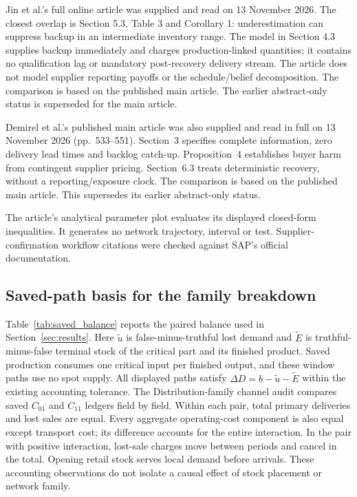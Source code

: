 \documentclass[preprint,11pt,authoryear]{elsarticle}
\begin{document}
Jin et al.'s full online article was supplied and read on 13 November 2026. The closest overlap is Section 5.3, Table 3 and Corollary 1: underestimation can suppress backup in an intermediate inventory range. The model in Section 4.3 supplies backup immediately and charges production-linked quantities; it contains no qualification lag or mandatory post-recovery delivery stream. The article does not model supplier reporting payoffs or the schedule/belief decomposition. The comparison is based on the published main article. The earlier abstract-only status is superseded for the main article.

Demirel et al.'s published main article was also supplied and read in full on 13 November 2026 (pp.~533--551). Section~3 specifies complete information, zero delivery lead times and backlog catch-up. Proposition~4 establishes buyer harm from contingent supplier pricing. Section~6.3 treats deterministic recovery, without a reporting/exposure clock. The comparison is based on the published main article. This supersedes its earlier abstract-only status.

The article's analytical parameter plot evaluates its displayed closed-form inequalities. It generates no network trajectory, interval or test. Supplier-confirmation workflow citations were checked against SAP's official documentation.
\subsection{Saved-path basis for the family breakdown}
Table~\ref{tab:saved_balance} reports the paired balance used in Section~\ref{sec:results}. Here $\widetilde u$ is false-minus-truthful lost demand and $\widetilde E$ is truthful-minus-false terminal stock of the critical part and its finished product. Saved production consumes one critical input per finished output, and these window paths use no spot supply. All displayed paths satisfy $\Delta D=b-\widetilde u-\widetilde E$ within the existing accounting tolerance. 
The Distribution-family channel audit compares saved $C_{01}$ and $C_{11}$ ledgers field by field. Within each pair, total primary deliveries and lost sales are equal. Every aggregate operating-cost component is also equal except transport cost; its difference accounts for the entire interaction. In the pair with positive interaction, lost-sale charges move between periods and cancel in the total. Opening retail stock serves local demand before arrivals. These accounting observations do not isolate a causal effect of stock placement or network family.
\end{document}
